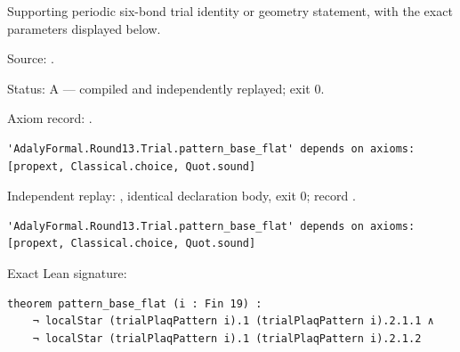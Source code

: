 \begin{theorem}[bp-406]
\label{bp-406}
\leanok
Supporting periodic six-bond trial identity or geometry statement, with the exact parameters displayed below.

\par Source: \texttt{}.
\par Status: A — compiled and independently replayed; exit 0.
\par Axiom record: \texttt{}.
\begin{verbatim}
'AdalyFormal.Round13.Trial.pattern_base_flat' depends on axioms: [propext, Classical.choice, Quot.sound]
\end{verbatim}
\par Independent replay: \texttt{}, identical declaration body, exit 0; record \texttt{}.
\begin{verbatim}
'AdalyFormal.Round13.Trial.pattern_base_flat' depends on axioms: [propext, Classical.choice, Quot.sound]
\end{verbatim}
\par Exact Lean signature:
\begin{verbatim}
theorem pattern_base_flat (i : Fin 19) :
    ¬ localStar (trialPlaqPattern i).1 (trialPlaqPattern i).2.1.1 ∧
    ¬ localStar (trialPlaqPattern i).1 (trialPlaqPattern i).2.1.2
\end{verbatim}
\end{theorem}

